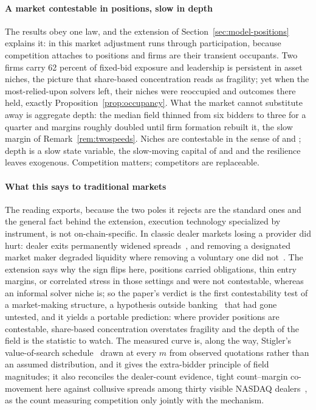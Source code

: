 \documentclass[11pt]{article}
\theoremstyle{plain}
\theoremstyle{definition}
\theoremstyle{remark}
\begin{document}
\paragraph{A market contestable in positions, slow in depth} The results obey one law, and the extension of Section~\ref{sec:model-positions} explains it: in this market adjustment runs through participation, because competition attaches to positions and firms are their transient occupants. Two firms carry 62 percent of fixed-bid exposure and leadership is persistent in asset niches, the picture that share-based concentration reads as fragility; yet when the most-relied-upon solvers left, their niches were reoccupied and outcomes there held, exactly Proposition~\ref{prop:occupancy}. What the market cannot substitute away is aggregate depth: the median field thinned from six bidders to three for a quarter and margins roughly doubled until firm formation rebuilt it, the slow margin of Remark~\ref{rem:twospeeds}. Niches are contestable in the sense of \citet{demsetz1968utilities} and \citet{baumol1982contestable}; depth is a slow state variable, the slow-moving capital of \citet{grossman1988liquidity} and \citet{duffie2010capital} and the resilience \citet{atkeson2015entry} leaves exogenous. Competition matters; competitors are replaceable.

\paragraph{What this says to traditional markets} The reading exports, because the two poles it rejects are the standard ones and the general fact behind the extension, execution technology specialized by instrument, is not on-chain-specific. In classic dealer markets losing a provider did hurt: dealer exits permanently widened spreads~\citep{wahal1997entry}, and removing a designated market maker degraded liquidity where removing a voluntary one did not~\citep{clarkjoseph2017designated,venkataraman2007value}. The extension says why the sign flips here, positions carried obligations, thin entry margins, or correlated stress in those settings and were not contestable, whereas an informal solver niche is; so the paper's verdict is the first contestability test of a market-making structure, a hypothesis outside banking~\citep{baumol1982contestable} that had gone untested, and it yields a portable prediction: where provider positions are contestable, share-based concentration overstates fragility and the depth of the field is the statistic to watch. The measured curve is, along the way, Stigler's value-of-search schedule~\citep{stigler1961information} drawn at every $m$ from observed quotations rather than an assumed distribution, and it gives the extra-bidder principle of \citet{bulow1996auctions} field magnitudes; it also reconciles the dealer-count evidence, tight count--margin co-movement here against collusive spreads among thirty visible NASDAQ dealers~\citep{christie1994nasdaq}, as the count measuring competition only jointly with the mechanism.
\end{document}
